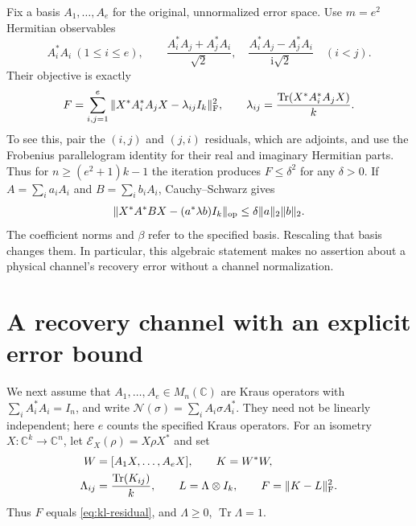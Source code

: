 \documentclass[11pt]{article}
\newcommand{\C}{\mathbb C}
\DeclareMathOperator{\Tr}{Tr}
\theoremstyle{remark}
\numberwithin{equation}{section}
\begin{document}
Fix a basis $A_1,\ldots,A_e$ for the original, unnormalized error space.
Use $m=e^2$ Hermitian observables
\begin{equation}\label{eq:arbitrary-observables}
 A_i^*A_i\ (1\le i\le e),\qquad
 \frac{A_i^*A_j+A_j^*A_i}{\sqrt2},\quad
 \frac{A_i^*A_j-A_j^*A_i}{\mathrm{i}\sqrt2}\quad(i<j).
\end{equation}
Their objective is exactly
\begin{equation}\label{eq:kl-residual}
 F=\sum_{i,j=1}^e
 \|X^*A_i^*A_jX-\lambda_{ij}I_k\|_{\rm F}^2,\qquad
 \lambda_{ij}=\frac{\Tr(X^*A_i^*A_jX)}{k}.
\end{equation}
To see this, pair the $(i,j)$ and $(j,i)$ residuals, which are adjoints,
and use the Frobenius parallelogram identity for their real and imaginary
Hermitian parts. Thus for $n\ge(e^2+1)k-1$ the iteration produces
$F\le\delta^2$ for any $\delta>0$. If $A=\sum_i a_iA_i$ and
$B=\sum_i b_iA_i$, Cauchy--Schwarz gives
\begin{equation}\label{eq:arbitrary-kl-bound}
 \|X^*A^*BX-(a^*\lambda b)I_k\|_{\rm op}
 \le\delta\|a\|_2\|b\|_2.
\end{equation}
The coefficient norms and $\beta$ refer to the specified basis.
Rescaling that basis changes them. In particular, this algebraic
statement makes no assertion about a physical channel's recovery error
without a channel normalization.

\section{A recovery channel with an explicit error bound}\label{sec:recovery}

We next assume that $A_1,\ldots,A_e\in M_n(\C)$ are Kraus operators
with $\sum_iA_i^*A_i=I_n$, and write
$\mathcal N(\sigma)=\sum_iA_i\sigma A_i^*$. They need not be
linearly independent; here $e$ counts the specified Kraus operators.
For an isometry $X:\C^k\to\C^n$, let
$\mathcal E_X(\rho)=X\rho X^*$ and set
\begin{equation}\label{eq:gram-data}
 \begin{split}
 W&=[A_1X,\ldots,A_eX],\qquad K=W^*W,\\
 \Lambda_{ij}&=\frac{\Tr(K_{ij})}{k},\qquad
 L=\Lambda\otimes I_k,\qquad F=\|K-L\|_{\rm F}^2.
 \end{split}
\end{equation}
Thus $F$ equals \eqref{eq:kl-residual}, and
$\Lambda\ge0$, $\Tr\Lambda=1$.
\end{document}
